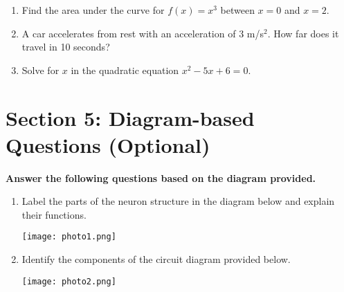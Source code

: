 \documentclass[a4paper,12pt]{article}   %
\begin{document}
	\begin{enumerate}
		\item Find the area under the curve for \(f(x) = x^3\) between \(x = 0\) and \(x = 2\).
		\item A car accelerates from rest with an acceleration of 3 m/s\(^2\). How far does it travel in 10 seconds?
		\item Solve for \(x\) in the quadratic equation \(x^2 - 5x + 6 = 0\).
	\end{enumerate}
	
	\vspace{0.5cm}
	
	\section*{Section 5: Diagram-based Questions (Optional)}
	\noindent\textbf{Answer the following questions based on the diagram provided.}
	
	\begin{enumerate}
		\item Label the parts of the neuron structure in the diagram below and explain their functions.
		\begin{center}
			\texttt{[image: photo1.png]}  %
		\end{center}
		
		\item Identify the components of the circuit diagram provided below.
		\begin{center}
			\texttt{[image: photo2.png]}  %
		\end{center}
	\end{enumerate}
	
\end{document}
